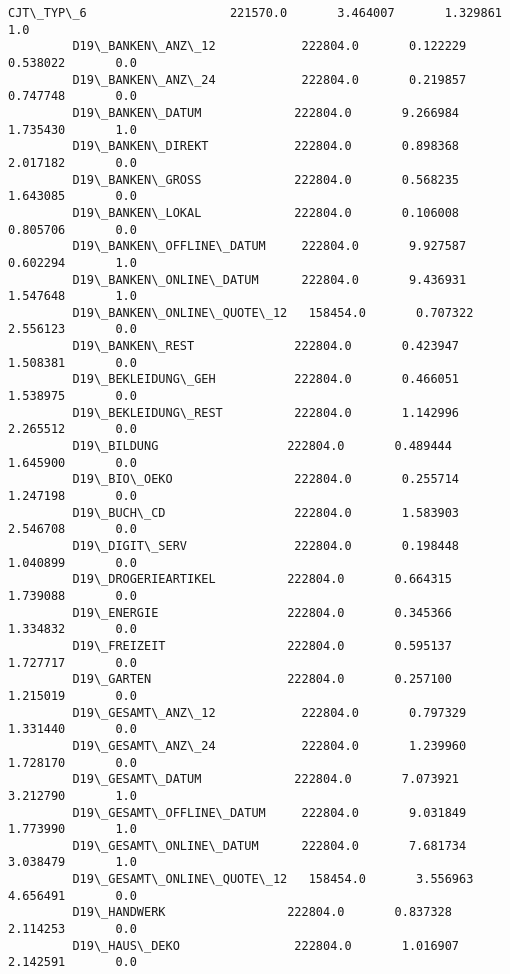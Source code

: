 \documentclass[11pt]{article}
\begin{document}
\begin{Verbatim}[commandchars=\\\{\}]
         CJT\_TYP\_6                    221570.0       3.464007       1.329861       1.0   
         D19\_BANKEN\_ANZ\_12            222804.0       0.122229       0.538022       0.0   
         D19\_BANKEN\_ANZ\_24            222804.0       0.219857       0.747748       0.0   
         D19\_BANKEN\_DATUM             222804.0       9.266984       1.735430       1.0   
         D19\_BANKEN\_DIREKT            222804.0       0.898368       2.017182       0.0   
         D19\_BANKEN\_GROSS             222804.0       0.568235       1.643085       0.0   
         D19\_BANKEN\_LOKAL             222804.0       0.106008       0.805706       0.0   
         D19\_BANKEN\_OFFLINE\_DATUM     222804.0       9.927587       0.602294       1.0   
         D19\_BANKEN\_ONLINE\_DATUM      222804.0       9.436931       1.547648       1.0   
         D19\_BANKEN\_ONLINE\_QUOTE\_12   158454.0       0.707322       2.556123       0.0   
         D19\_BANKEN\_REST              222804.0       0.423947       1.508381       0.0   
         D19\_BEKLEIDUNG\_GEH           222804.0       0.466051       1.538975       0.0   
         D19\_BEKLEIDUNG\_REST          222804.0       1.142996       2.265512       0.0   
         D19\_BILDUNG                  222804.0       0.489444       1.645900       0.0   
         D19\_BIO\_OEKO                 222804.0       0.255714       1.247198       0.0   
         D19\_BUCH\_CD                  222804.0       1.583903       2.546708       0.0   
         D19\_DIGIT\_SERV               222804.0       0.198448       1.040899       0.0   
         D19\_DROGERIEARTIKEL          222804.0       0.664315       1.739088       0.0   
         D19\_ENERGIE                  222804.0       0.345366       1.334832       0.0   
         D19\_FREIZEIT                 222804.0       0.595137       1.727717       0.0   
         D19\_GARTEN                   222804.0       0.257100       1.215019       0.0   
         D19\_GESAMT\_ANZ\_12            222804.0       0.797329       1.331440       0.0   
         D19\_GESAMT\_ANZ\_24            222804.0       1.239960       1.728170       0.0   
         D19\_GESAMT\_DATUM             222804.0       7.073921       3.212790       1.0   
         D19\_GESAMT\_OFFLINE\_DATUM     222804.0       9.031849       1.773990       1.0   
         D19\_GESAMT\_ONLINE\_DATUM      222804.0       7.681734       3.038479       1.0   
         D19\_GESAMT\_ONLINE\_QUOTE\_12   158454.0       3.556963       4.656491       0.0   
         D19\_HANDWERK                 222804.0       0.837328       2.114253       0.0   
         D19\_HAUS\_DEKO                222804.0       1.016907       2.142591       0.0   

\end{Verbatim}
\end{document}
